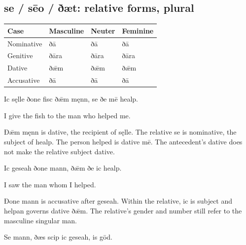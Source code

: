 \subsection*{se /\allowbreak{} sēo /\allowbreak{} ðæt: relative forms, plural}

\par\begingroup
\fontsize{10.5}{13.2}\selectfont
\setlength{\LTleft}{0pt}\setlength{\LTright}{\fill}
\noindent
\begin{tabular}{@{}>{\raggedright\arraybackslash}p{28.89mm}>{\raggedright\arraybackslash}p{28.89mm}>{\raggedright\arraybackslash}p{28.89mm}>{\raggedright\arraybackslash}p{28.89mm}@{}}
\toprule
\textbf{Case} & \textbf{Masculine} & \textbf{Neuter} & \textbf{Feminine} \\
\midrule
Nominative & ðā & ðā & ðā \\
Genitive & ðāra & ðāra & ðāra \\
Dative & ðǣm & ðǣm & ðǣm \\
Accusative & ðā & ðā & ðā \\
\bottomrule
\end{tabular}
\par\endgroup

Ic sęlle ðone fisc ðǣm męnn, se ðe mē healp.

I give the fish to the man who helped me.

Ðǣm męnn is dative, the recipient of sęlle. The relative se is nominative, the subject of healp. The person helped is dative mē. The antecedent’s dative does not make the relative subject dative.

Ic geseah ðone mann, ðǣm ðe ic healp.

I saw the man whom I helped.

Ðone mann is accusative after geseah. Within the relative, ic is subject and helpan governs dative ðǣm. The relative’s gender and number still refer to the masculine singular man.

Se mann, ðæs scip ic geseah, is gōd.

